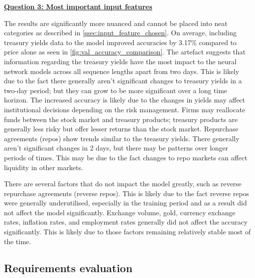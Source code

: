 \hyperref[most_important_features_question]{\textbf{Question 3: Most important input features}}

The results are significantly more nuanced and cannot be placed into neat categories as described in \autoref{ssec:input_feature_chosen}.
On average, including treasury yields data to the model improved accuracies by 3.17\% compared to price alone as seen in
\autoref{fig:val_accuracy_comparison}.
The artefact suggests that information regarding the treasury yields have the most impact to the neural network models across all sequence
lengths apart from two days. 
This is likely due to the fact there generally aren't significant changes to treasury yields in a two-day period; but they can
grow to be more significant over a long time horizon. The increased accuracy is likely due to the changes in yields may affect institutional decisions
depending on the risk management. Firms may reallocate funds between the stock market and treasury products; treasury products are generally less risky but
offer lesser returns than the stock market. Repurchase agreements (repos) show trends similar to the treasury yields. There generally aren't significant
changes in 2 days, but there may be patterns over longer periods of times. This may be due to the fact changes to repo markets
can affect liquidity in other markets.

There are several factors that do not impact the model greatly, such as reverse repurchase agreements (reverse repos).
This is likely due to the fact reverse repos were generally underutilised, especially in the training period and as a result did 
not affect the model significantly. Exchange volume, gold, currency exchange rates, inflation rates, and employment rates
generally did not affect the accuracy significantly. This is likely due to those factors remaining relatively stable most of the time.

\subsection{Requirements evaluation}
